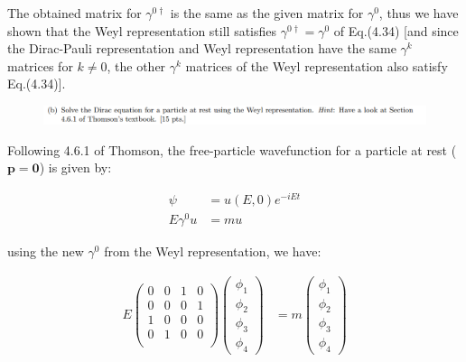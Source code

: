 \documentclass[11pt]{article}
\theoremstyle{definition}
\begin{document}
\begin{mdframed}
    The obtained matrix for $\gamma^{0\dagger}$ is the same as the given matrix for $\gamma^{0}$, thus we have shown that the Weyl representation still satisfies $\gamma^{0\dagger} = \gamma^{0}$ of Eq.(4.34) [and since the Dirac-Pauli representation and Weyl representation have the same $\gamma^{k}$ matrices for $k \neq 0$, the other $\gamma^{k}$ matrices of the Weyl representation also satisfy Eq.(4.34)].
\end{mdframed}
\newpage



\begin{figure}[H]
    \centering
    \includegraphics[scale = 0.5]{2b.png}
\end{figure}

Following 4.6.1 of Thomson, the free-particle wavefunction for a particle at rest ($\mathbf{p=0}$) is given by:

\begin{align}
    \psi &= u(E,0) e^{-iEt}\\
    E \gamma^{0}u &= mu
\end{align}

using the new $\gamma^0$ from the Weyl representation, we have:

\begin{align}
    E
    \begin{pmatrix}
        0 & 0 & 1 & 0\\
        0 & 0 & 0 & 1\\
        1 & 0 & 0 & 0\\
        0 & 1 & 0 & 0\\
    \end{pmatrix}
    \begin{pmatrix}
        \phi_1\\
        \phi_2\\
        \phi_3\\
        \phi_4
    \end{pmatrix}
    &=
    m
    \begin{pmatrix}
        \phi_1\\
        \phi_2\\
        \phi_3\\
        \phi_4
    \end{pmatrix}\\
\end{align}
\end{document}
